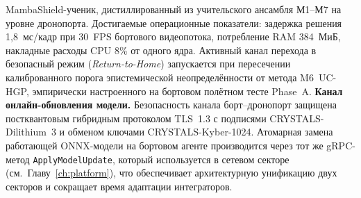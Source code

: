 \textsf{MambaShield}-ученик, дистиллированный из учительского
ансамбля М1--М7 на уровне дронопорта. Достигаемые операционные
показатели: задержка решения 1{,}8~мс/кадр при 30~FPS бортового
видеопотока, потребление RAM 384~МиБ, накладные расходы CPU 8\%
от одного ядра. Активный канал перехода в безопасный режим
(\emph{Return-to-Home}) запускается при пересечении калиброванного
порога эпистемической неопределённости от метода \textsf{M6~UC-HGP},
эмпирически настроенного на бортовом полётном тесте Phase~A.
\noindent\textbf{Канал онлайн-обновления модели.} Безопасность
канала борт--дронопорт защищена постквантовым гибридным
протоколом TLS~1.3 с подписями CRYSTALS-Dilithium~3 и обменом
ключами CRYSTALS-Kyber-1024. Атомарная замена работающей
ONNX-модели на бортовом агенте производится через тот же
gRPC-метод \texttt{ApplyModelUpdate}, который используется в
сетевом секторе (см.~Главу~\ref{ch:platform}), что обеспечивает
архитектурную унификацию двух секторов и сокращает время
адаптации интеграторов.
